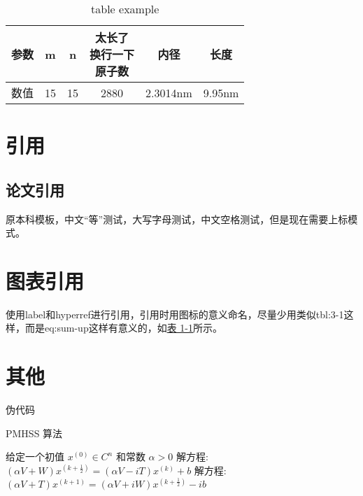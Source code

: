 \documentclass[AutoFakeBold]{LZUThesis-PgD&PhD}
\begin{document}
\begin{table}[hbt!]\label{tbl:mole}
  \centering
  \begin{tabular*}{0.9\textwidth}{@{\extracolsep{\fill}}cccccc}
    \toprule
        参数& m & n & \tabincell{c}{太长了\\换行一下\\原子数}  & 内径 & 长度\\
    \midrule
    数值 & 15 & 15  & 2880 & 2.3014nm & 9.95nm \\
    \bottomrule
  \end{tabular*}
  \caption{table example}
\end{table}


\section{引用}

\subsection{论文引用}

原本科模板\cite{partl2016}，中文“等”测试\cite{partl2021}，大写字母测试\cite{partl2022-2}，中文空格测试\cite{partl2022}，但是现在需要上标模式。

\section{图表引用}


使用label和hyperref进行引用，引用时用图标的意义命名，尽量少用类似tbl:3-1这样，而是eq:sum-up这样有意义的，如\hyperref[tbl:mole]{表 1-1}所示。

\section{其他}


伪代码

\begin{algorithm}[H]
    \caption{PMHSS 算法\label{Alg:PMHSS}}
    \begin{algorithmic}[1]
      \State 给定一个初值 $ x^{(0)} \in C^{n} $  和常数 $\alpha>0$
      \State 解方程: $(\alpha V+W)x^{(k+\frac{1}{2})}=(\alpha V-i T)x^{(k)}+b $
      \State 解方程: $(\alpha V+T)x^{(k+1)}=(\alpha V+i W)x^{(k+\frac{1}{2})}-i b$
      \EndFor
    \end{algorithmic}
\end{algorithm}
\end{document}
